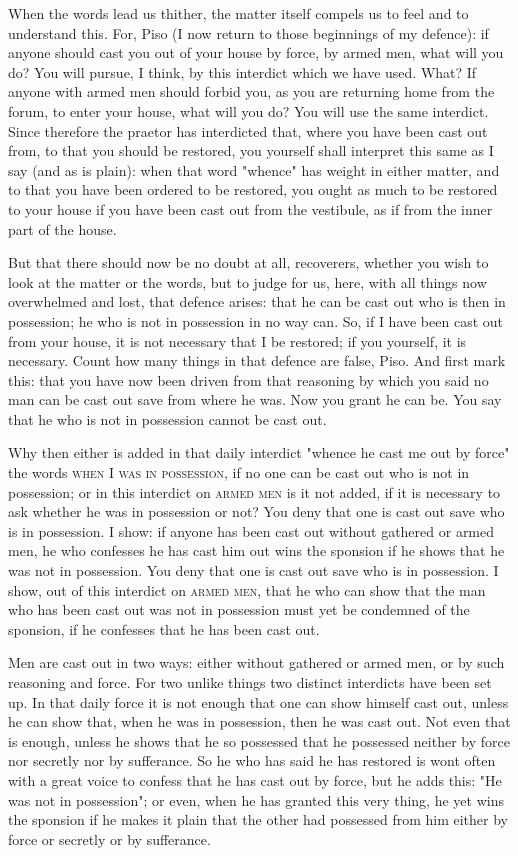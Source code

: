  When the words lead us thither, the matter itself compels us to feel and to understand this. For, Piso (I now return to those beginnings of my defence): if anyone should cast you out of your house by force, by armed men, what will you do? You will pursue, I think, by this interdict which we have used. What? If anyone with armed men should forbid you, as you are returning home from the forum, to enter your house, what will you do? You will use the same interdict. Since therefore the praetor has interdicted that, where you have been cast out from, to that you should be restored, you yourself shall interpret this same as I say (and as is plain): when that word "whence" has weight in either matter, and to that you have been ordered to be restored, you ought as much to be restored to your house if you have been cast out from the vestibule, as if from the inner part of the house.

 But that there should now be no doubt at all, recoverers, whether you wish to look at the matter or the words, but to judge for us, here, with all things now overwhelmed and lost, that defence arises: that he can be cast out who is then in possession; he who is not in possession in no way can. So, if I have been cast out from your house, it is not necessary that I be restored; if you yourself, it is necessary. Count how many things in that defence are false, Piso. And first mark this: that you have now been driven from that reasoning by which you said no man can be cast out save from where he was. Now you grant he can be. You say that he who is not in possession cannot be cast out.

 Why then either is added in that daily interdict "whence he cast me out by force" the words \textsc{when I was in possession}, if no one can be cast out who is not in possession; or in this interdict on \textsc{armed men} is it not added, if it is necessary to ask whether he was in possession or not? You deny that one is cast out save who is in possession. I show: if anyone has been cast out without gathered or armed men, he who confesses he has cast him out wins the sponsion if he shows that he was not in possession. You deny that one is cast out save who is in possession. I show, out of this interdict on \textsc{armed men}, that he who can show that the man who has been cast out was not in possession must yet be condemned of the sponsion, if he confesses that he has been cast out.

 Men are cast out in two ways: either without gathered or armed men, or by such reasoning and force. For two unlike things two distinct interdicts have been set up. In that daily force it is not enough that one can show himself cast out, unless he can show that, when he was in possession, then he was cast out. Not even that is enough, unless he shows that he so possessed that he possessed neither by force nor secretly nor by sufferance. So he who has said he has restored is wont often with a great voice to confess that he has cast out by force, but he adds this: "He was not in possession"; or even, when he has granted this very thing, he yet wins the sponsion if he makes it plain that the other had possessed from him either by force or secretly or by sufferance.

